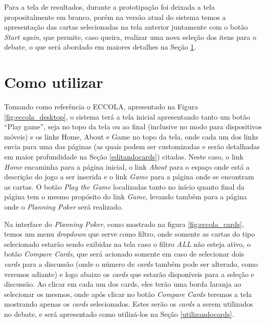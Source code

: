 Para a tela de resultados, durante a prototipação foi deixada a tela propositalmente em branco, porém na versão atual do sistema temos a apresentação das cartas selecionadas na tela anterior juntamente com o botão \textit{Start again}, que permite, caso queira, realizar uma nova seleção dos itens para o debate, o que será abordado em maiores detalhes na Seção \ref{Como utilizar}.

\section{Como utilizar}
\label{Como utilizar}

Tomando como referência o ECCOLA, apresentado na Figura \ref{fig:eccola_desktop}, o sistema terá a tela inicial apresentando tanto um botão ``Play game'', seja no topo da tela ou ao final (inclusive no modo para dispositivos móveis) e os links Home, About e Game no topo da tela, onde cada um dos links envia para uma das páginas (as quais podem ser customizadas e serão detalhadas em maior profundidade na Seção \ref{editandocards}) citadas. Neste caso, o link \textit{Home} encaminha para a página inicial, o link \textit{About} para o espaço onde está a descrição do jogo a ser inserida e o link \textit{Game} para a página onde se encontram as cartas. O botão \textit{Play the Game} localizadas tanto no início quanto final da página  tem o mesmo propósito do link \textit{Game}, levando também para a página onde o \textit{Planning Poker} será realizado.

Na interface do \textit{Planning Poker}, como mostrado na figura \ref{fig:eccola_cards}, temos um menu \textit{dropdown} que serve como filtro, onde somente as cartas do tipo selecionado estarão sendo exibidas na tela caso o filtro \textit{ALL} não esteja ativo, o botão \textit{Compare Cards}, que será acionado somente em caso de selecionar dois \textit{cards} para a discussão (onde o número de \textit{cards} também pode ser alterado, como veremos adiante) e logo abaixo os \textit{cards} que estarão disponíveis para a seleção e discussão. Ao clicar em cada um dos cards, eles terão uma borda laranja ao selecionar os mesmos, onde após clicar no botão \textit{Compare Cards} teremos a tela mostrando apenas os \textit{cards} selecionados. Estes serão os \textit{cards} a serem utilizados no debate, e será apresentado como utilizá-los na Seção \ref{utilizandocards}.

